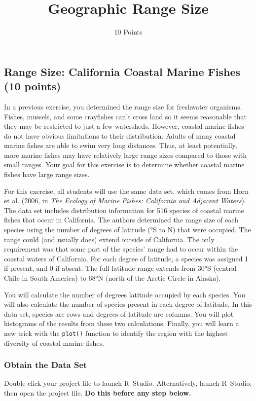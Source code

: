 \documentclass[11pt]{article}
\title{Geographic Range Size}
\author{10 Points}
\date{}                                           %
\begin{document}
	\thispagestyle{first_page}

\subsection*{Range Size: California Coastal Marine Fishes (10 points)}

In a previous exercise, you determined the range size for freshwater
organisms. Fishes, mussels, and some crayfishes can't cross land so it seems
reasonable that they may be restricted to just a few watersheds.
However, coastal marine fishes do not have obvious limitations to their
distribution. Adults of many coastal marine fishes are able to swim very
long distances. Thus, at least potentially, more marine fishes may have
relatively large range sizes compared to those with small ranges. Your
goal for this exercise is to determine whether coastal marine fishes
have large range sizes.

For this exercise, all students will use the same data set, which comes
from Horn et al. (2006, in \emph{The Ecology of Marine Fishes:
California and Adjacent Waters}). The data set includes distribution
information for 516 species of coastal marine fishes that occur in
California. The authors determined the range size of each species using
the number of degrees of latitude (°S to N) that were occupied. The
range could (and usually does) extend outside of California. The only
requirement was that some part of the species' range had to occur within
the coastal waters of California. For each degree of latitude, a species
was assigned 1 if present, and 0 if absent. The full latitude range
extends from 30°S (central Chile in South America) to 68°N (north of the
Arctic Circle in Alaska).

You will calculate the number of degrees latitude occupied by each
species. You will also calculate the number of species present in each
degree of latitude. In this data set, species are rows and degrees of
latitude are columns. You will plot histograms of the results from these
two calculations. Finally, you will learn a new trick with the
\texttt{plot()} function to identify the region with the highest
diversity of coastal marine fishes.

\subsubsection*{Obtain the Data Set}

Double-click your project file to launch R~Studio. Alternatively, launch R~Studio, then open the project file. \textbf{Do this before any step below.}
\end{document}
